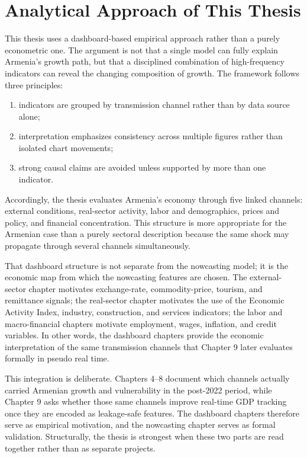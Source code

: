 \documentclass[12pt,a4paper]{report}
\begin{document}
\section{Analytical Approach of This Thesis}
This thesis uses a dashboard-based empirical approach rather than a purely econometric one. The argument is not that a single model can fully explain Armenia's growth path, but that a disciplined combination of high-frequency indicators can reveal the changing composition of growth. The framework follows three principles:
\begin{enumerate}
    \item indicators are grouped by transmission channel rather than by data source alone;
    \item interpretation emphasizes consistency across multiple figures rather than isolated chart movements;
    \item strong causal claims are avoided unless supported by more than one indicator.
\end{enumerate}

Accordingly, the thesis evaluates Armenia's economy through five linked channels: external conditions, real-sector activity, labor and demographics, prices and policy, and financial concentration. This structure is more appropriate for the Armenian case than a purely sectoral description because the same shock may propagate through several channels simultaneously.

That dashboard structure is not separate from the nowcasting model; it is the economic map from which the nowcasting features are chosen. The external-sector chapter motivates exchange-rate, commodity-price, tourism, and remittance signals; the real-sector chapter motivates the use of the Economic Activity Index, industry, construction, and services indicators; the labor and macro-financial chapters motivate employment, wages, inflation, and credit variables. In other words, the dashboard chapters provide the economic interpretation of the same transmission channels that Chapter 9 later evaluates formally in pseudo real time.

This integration is deliberate. Chapters 4--8 document which channels actually carried Armenian growth and vulnerability in the post-2022 period, while Chapter 9 asks whether those same channels improve real-time GDP tracking once they are encoded as leakage-safe features. The dashboard chapters therefore serve as empirical motivation, and the nowcasting chapter serves as formal validation. Structurally, the thesis is strongest when these two parts are read together rather than as separate projects.
\end{document}
